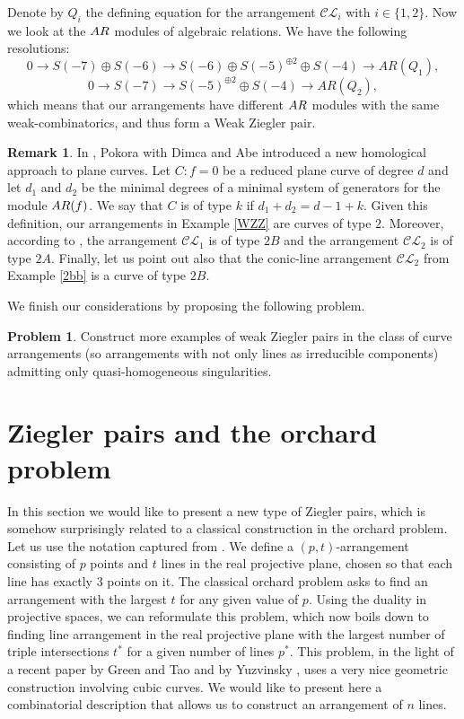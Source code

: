 \documentclass[12pt]{article}
\theoremstyle{plain}
\theoremstyle{definition}
\newtheorem{remark}[thm]{Remark}
\newtheorem{problem}[thm]{Problem}
\begin{document}
\noindent
Denote by $Q_{i}$ the defining equation for the arrangement $\mathcal{CL}_{i}$ with $i \in\{1,2\}$. Now we look at the ${\rm AR}$ modules of algebraic relations. We have the following resolutions:
\begin{equation*}
0\rightarrow S(-7) \oplus S(-6) \rightarrow S(-6)\oplus S(-5)^{\oplus2} \oplus S(-4) \rightarrow AR(Q_{1}),
\end{equation*}
\begin{equation*}
0\rightarrow S(-7) \rightarrow S(-5)^{\oplus2} \oplus S(-4) \rightarrow AR(Q_{2}),
\end{equation*}
which means that our arrangements have different ${\rm AR}$ modules with the same weak-combinatorics, and thus form a Weak Ziegler pair.
\begin{remark}
\label{rrr}
In \cite{her}, Pokora with Dimca and Abe introduced a new homological approach to plane curves. Let $C: f=0$ be a reduced plane curve of degree $d$ and let $d_1$ and $d_2$ be the minimal degrees of a minimal system of generators for the module ${\rm AR}(f)$. We say that $C$ is of type $k$ if $d_1+d_2=d-1+k$. Given this definition, our arrangements in Example \ref{WZZ} are curves of type $2$. Moreover, according to \cite[Proposition 1.13]{her}, the arrangement $\mathcal{CL}_{1}$ is of type $2B$ and the arrangement $\mathcal{CL}_{2}$ is of type $2A$. Finally, let us point out also that the conic-line arrangement $\mathcal{CL}_{2}$ from Example \ref{2bb} is a curve of type $2B$.
\end{remark}

We finish our considerations by proposing the following problem.
\begin{problem}
Construct more examples of weak Ziegler pairs in the class of curve arrangements (so arrangements with not only lines as irreducible components) admitting only quasi-homogeneous singularities.
\end{problem}
\section{Ziegler pairs and the orchard problem}
In this section we would like to present a new type of Ziegler pairs, which is somehow surprisingly related to a classical construction in the orchard problem. Let us use the notation captured from \cite{Burr}. We define a $(p,t)$-arrangement consisting of $p$ points and $t$ lines in the real projective plane, chosen so that each line has exactly $3$ points on it. The classical orchard problem asks to find an arrangement with the largest $t$ for any given value of $p$. Using the duality in projective spaces, we can reformulate this problem, which now boils down to finding line arrangement in the real projective plane with the largest number of triple intersections $t^{*}$ for a given number of lines $p^{*}$. This problem, in the light of a recent paper by Green and Tao \cite{Green} and by Yuzvinsky \cite{Y}, uses a very nice geometric construction involving cubic curves. We would like to present here a combinatorial description that allows us to construct an arrangement of $n$ lines.
\end{document}

